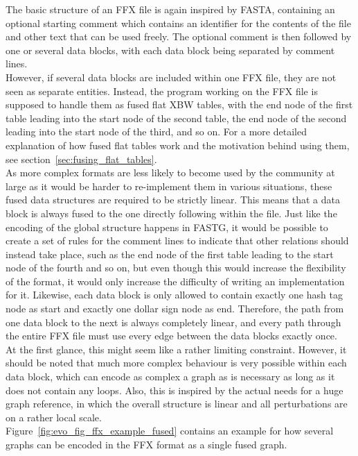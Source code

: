 \documentclass[a4paper,12pt,twoside,BCOR=10mm]{scrbook}
\begin{document}
The basic structure of an FFX file is again inspired by FASTA,
containing an optional starting comment which contains an identifier for
the contents of the file and other text that can be used freely.
The optional comment is then followed by one or several data blocks,
with each data block being separated by comment lines. \\
However, if several data blocks are included within one FFX file,
they are not seen as separate entities. Instead, the program working on
the FFX file is supposed to handle them as fused flat XBW tables,
with the end node of the first table leading into the start node of the
second table, the end node of the second leading into the start node of the
third, and so on.
For a more detailed explanation of how fused
flat tables work and the motivation behind using them,
see section~\ref{sec:fusing_flat_tables}. \\
As more complex formats are less likely to become
used by the community at large as it would be harder to re-implement them
in various situations, these fused data structures are required to be strictly linear.
This means that a data block is always fused to the one directly following
within the file.
Just like the encoding of the global structure happens in FASTG,
it would be possible to create a set of rules for the comment
lines to indicate that other relations should instead take place, such as the
end node of the first table leading to the start node of the fourth and so on,
but even though this would increase the flexibility of the format, it would only
increase the difficulty of writing an implementation for it.
Likewise, each data block is only allowed to contain exactly one hash tag node
as start and exactly one dollar sign node as end. Therefore, the path from one
data block to the next is always completely linear, and every path through the
entire FFX file must use every edge between the data blocks exactly once. \\
At the first glance, this might seem like a rather limiting constraint.
However, it should be noted that much more complex behaviour is very possible
within each data block, which can encode as complex a graph as is necessary
as long as it does not contain any loops.
Also, this is inspired by the actual needs for a huge graph reference,
in which the overall structure is linear and all perturbations are on a
rather local scale. \\
Figure~\ref{fig:evo_fig_ffx_example_fused} contains an example for
how several graphs can be encoded in the FFX format as a single fused graph.
\end{document}
